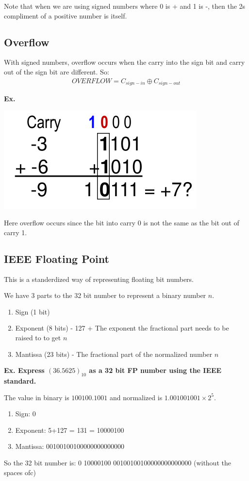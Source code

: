 \documentclass[12pt,letterpaper]{article} \usepackage{amsmath} \usepackage{graphicx} \usepackage[margin=1in]{geometry} \usepackage{longtable}  \usepackage{amssymb}
\begin{document}
		Note that when we are using signed numbers where 0 is + and 1 is -, then the 2s compliment of a positive number is itself.  
		
		\subsection{Overflow}
		With signed numbers, overflow occurs when the carry into the sign bit and carry out of the sign bit are different. So:
		\begin{align*}
			OVERFLOW = C_{sign-in} \oplus C_{sign-out}
		\end{align*}
		
		\begin{mdframed}[]
			\textbf{Ex. }
			\begin{center}
			\includegraphics[width=0.3\linewidth]{ex3}
			\end{center}
			Here overflow occurs since the bit into carry 0 is not the same as the bit out of carry 1. 
		
		\end{mdframed}
		
		\subsection{IEEE Floating Point}
		This is a standerdized way of representing floating bit numbers. 
		
		We have 3 parts to the 32 bit number to represent a binary number $n$. 
		\begin{enumerate}[]
			\item Sign (1 bit)
			\item Exponent (8 bits) - 127 + The exponent the fractional part needs to be raised to to get $n$ 
			\item Mantissa (23 bits) - The fractional part of the normalized number $n$
		\end{enumerate}
	
		\begin{mdframed}[]
		\textbf{Ex. Express $(36.5625)_{10}$ as a 32 bit FP number using the IEEE standard.}
		
		The value in binary is $100100.1001$ and normalized is $1.001001001 \times 2^5$.
		
		\begin{enumerate}[noitemsep]
			\item Sign: 0
			\item Exponent: 5+127 = 131 = 10000100 
			\item Mantissa: 00100100100000000000000
		\end{enumerate}
		
		So the 32 bit number is: 0 10000100 00100100100000000000000 (without the spaces ofc)
		\end{mdframed}
		
\end{document}
